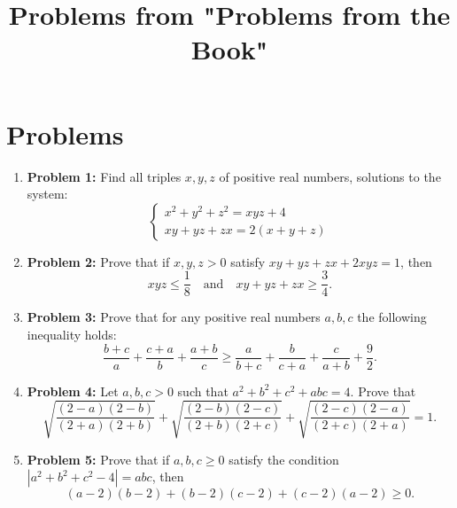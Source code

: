 \documentclass{article}
\title{Problems from "Problems from the Book"}
\author{}
\date{}
\begin{document}
\maketitle

\section*{Problems}

\begin{enumerate}
    \item \textbf{Problem 1:} Find all triples \( x, y, z \) of positive real numbers, solutions to the system:
    \[
    \begin{cases}
        x^2 + y^2 + z^2 = xyz + 4 \\
        xy + yz + zx = 2(x + y + z)
    \end{cases}
    \]
    
    \vspace{3cm}
    
    \item \textbf{Problem 2:} Prove that if \( x, y, z > 0 \) satisfy \( xy + yz + zx + 2xyz = 1 \), then
    \[
    xyz \leq \frac{1}{8} \quad \text{and} \quad xy + yz + zx \geq \frac{3}{4}.
    \]
    
    \vspace{3cm}
    
    \item \textbf{Problem 3:} Prove that for any positive real numbers \( a, b, c \) the following inequality holds:
    \[
    \frac{b + c}{a} + \frac{c + a}{b} + \frac{a + b}{c} \geq \frac{a}{b + c} + \frac{b}{c + a} + \frac{c}{a + b} + \frac{9}{2}.
    \]
    
    \vspace{3cm}
    
    \item \textbf{Problem 4:} Let \( a, b, c > 0 \) such that \( a^2 + b^2 + c^2 + abc = 4 \). Prove that
    \[
    \sqrt{\frac{(2 - a)(2 - b)}{(2 + a)(2 + b)}} + \sqrt{\frac{(2 - b)(2 - c)}{(2 + b)(2 + c)}} + \sqrt{\frac{(2 - c)(2 - a)}{(2 + c)(2 + a)}} = 1.
    \]
    
    \vspace{3cm}
    
    \item \textbf{Problem 5:} Prove that if \( a, b, c \geq 0 \) satisfy the condition \( |a^2 + b^2 + c^2 - 4| = abc \), then
    \[
    (a - 2)(b - 2) + (b - 2)(c - 2) + (c - 2)(a - 2) \geq 0.
    \]
    

\end{enumerate}
\end{document}
